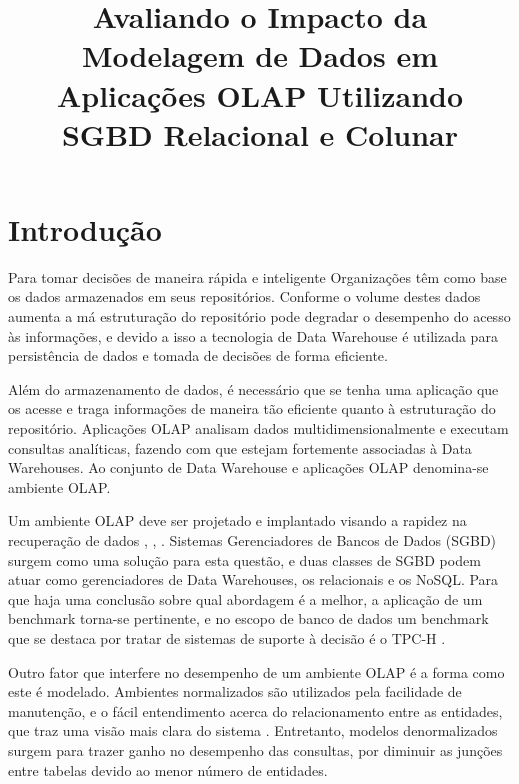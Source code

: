 \documentclass[12pt]{article}
\begin{document}
 

\title{Avaliando o Impacto da Modelagem de Dados em Aplicações OLAP Utilizando SGBD Relacional e Colunar}
\author{}
\address{}

\maketitle

\begin{abstract}
\end{abstract}
     
\begin{resumo}
\end{resumo}

\section{Introdução}
Para tomar decisões de maneira rápida e inteligente Organizações têm como base os dados armazenados em seus repositórios.
Conforme o volume destes dados aumenta a má estruturação do repositório pode degradar o desempenho do acesso às informações,
e devido a isso a tecnologia de Data Warehouse é utilizada para persistência de dados e tomada de decisões de forma eficiente.

Além do armazenamento de dados, é necessário que se tenha uma aplicação que os acesse e traga informações
de maneira tão eficiente quanto à estruturação do repositório. Aplicações OLAP analisam dados multidimensionalmente 
e executam consultas analíticas, fazendo com que estejam fortemente associadas à Data Warehouses.
Ao conjunto de Data Warehouse e aplicações OLAP denomina-se ambiente OLAP.

Um ambiente OLAP deve ser projetado e implantado visando a rapidez na recuperação de dados \cite{wrembel2007data}, 
\cite{codd1998providing}, \cite{kimball2002dw}. Sistemas Gerenciadores de Bancos de Dados (SGBD) surgem como uma solução 
para esta questão, e duas classes de SGBD podem atuar como gerenciadores de Data Warehouses, os relacionais e os NoSQL. 
Para que haja uma conclusão sobre qual abordagem é a melhor, a aplicação de um benchmark torna-se pertinente, 
e no escopo de banco de dados um benchmark que se destaca por tratar de sistemas de suporte à decisão é o TPC-H \cite{tpch2017page}. 

Outro fator que interfere no desempenho de um ambiente OLAP é a forma como este é modelado. 
Ambientes normalizados são utilizados pela facilidade de manutenção,
e o fácil entendimento acerca do relacionamento entre as entidades, que traz uma visão mais clara do sistema \cite{bax2003modelagem}. 
Entretanto, modelos denormalizados surgem para trazer ganho no desempenho das consultas, por diminuir 
as junções entre tabelas devido ao menor número de entidades.
\end{document}
